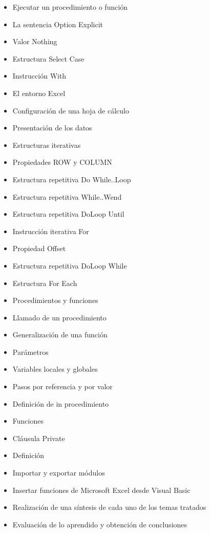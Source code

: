 \begin{itemize}
\item Ejecutar un procedimiento o función
\item La sentencia Option Explicit
\item Valor Nothing
\item Estructura Select Case
\item Instrucción With
\item El entorno Excel
\item Configuración de una hoja de cálculo
\item Presentación de los datos
\item Estructuras iterativas
\item Propiedades ROW y COLUMN
\item Estructura repetitiva Do While..Loop
\item Estructura repetitiva While..Wend
\item Estructura repetitiva DoLoop Until
\item Instrucción iterativa For
\item Propiedad Offset
\item Estructura repetitiva DoLoop While
\item Estructura For Each
\item Procedimientos y funciones
\item Llamado de un procedimiento
\item Generalización de una función
\item Parámetros
\item Variables locales y globales
\item Pasos por referencia y por valor
\item Definición de in procedimiento
\item Funciones
\item Cláusula Private
\item Definición
\item Importar y exportar módulos
\item Insertar funciones de Microsoft Excel desde Visual Basic
\item Realización de una síntesis de cada uno de los temas tratados
\item Evaluación de lo aprendido y obtención de conclusiones

\end{itemize}